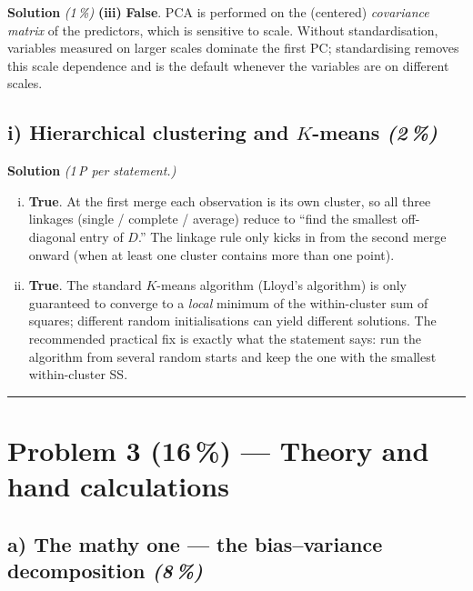 \documentclass[11pt,a4paper]{article}
\newcommand{\points}[1]{\textbf{(#1\,\%)}}
\newcommand{\subpoints}[1]{\textit{(#1\,\%)}}
\newcommand{\sol}{\noindent\textbf{Solution}}
\begin{document}
\medskip
\sol{} \subpoints{1} \textbf{(iii)} \textbf{False}. PCA is performed on the (centered)
\emph{covariance matrix} of the predictors, which is sensitive to scale. Without standardisation,
variables measured on larger scales dominate the first PC; standardising removes this scale
dependence and is the default whenever the variables are on different scales.

\subsection*{i) Hierarchical clustering and $K$-means \subpoints{2}}
\sol{} \emph{(1\,P per statement.)}
\begin{enumerate}[(i)]
  \item \textbf{True}. At the first merge each observation is its own cluster, so all three
        linkages (single / complete / average) reduce to ``find the smallest off-diagonal entry of
        $D$.'' The linkage rule only kicks in from the second merge onward (when at least one
        cluster contains more than one point).
  \item \textbf{True}. The standard $K$-means algorithm (Lloyd's algorithm) is only guaranteed to
        converge to a \emph{local} minimum of the within-cluster sum of squares; different random
        initialisations can yield different solutions. The recommended practical fix is exactly
        what the statement says: run the algorithm from several random starts and keep the one
        with the smallest within-cluster SS.
\end{enumerate}

\vspace{0.6em}
\hrule
\vspace{1em}

\section*{Problem 3 \points{16} --- Theory and hand calculations}

\subsection*{a) The mathy one --- the bias--variance decomposition \subpoints{8}}
\end{document}
